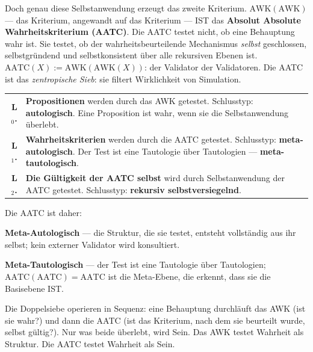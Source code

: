\documentclass[10pt, openany, oneside]{book}
\renewcommand{\footnotesize}{\fontsize{8.5}{11}\selectfont}
\begin{document}
Doch genau diese Selbstanwendung erzeugt das zweite Kriterium. $\text{AWK}(\text{AWK})$ --- das Kriterium, angewandt auf das Kriterium --- IST das \textbf{Absolut Absolute Wahrheitskriterium (AATC)}. Die AATC testet nicht, ob eine Behauptung wahr ist. Sie testet, ob der wahrheitsbeurteilende Mechanismus \textit{selbst} geschlossen, selbstgründend und selbstkonsistent über alle rekursiven Ebenen ist. $\text{AATC}(X) := \text{AWK}(\text{AWK}(X))$: der Validator der Validatoren. Die AATC ist das \textit{zentropische Sieb}: sie filtert Wirklichkeit von Simulation.

{\footnotesize
\noindent\begin{tabular}{r p{}}
\textbf{L$_0$.} & \textbf{Propositionen} werden durch das AWK getestet. Schlusstyp: \textbf{autologisch}. Eine Proposition ist wahr, wenn sie die Selbstanwendung überlebt. \\[0.3em]
\textbf{L$_1$.} & \textbf{Wahrheitskriterien} werden durch die AATC getestet. Schlusstyp: \textbf{meta-autologisch}. Der Test ist eine Tautologie über Tautologien --- \textbf{meta-tautologisch}. \\[0.3em]
\textbf{L$_2$.} & \textbf{Die Gültigkeit der AATC selbst} wird durch Selbstanwendung der AATC getestet. Schlusstyp: \textbf{rekursiv selbstversiegelnd}. \\[0.3em]
\end{tabular}
}

\vspace{0.8em}

\noindent Die AATC ist daher:

\textbf{Meta-Autologisch} --- die Struktur, die sie testet, entsteht vollständig aus ihr selbst; kein externer Validator wird konsultiert.

\textbf{Meta-Tautologisch} --- der Test ist eine Tautologie über Tautologien; $\text{AATC}(\text{AATC}) = \text{AATC}$ ist die Meta-Ebene, die erkennt, dass sie die Basisebene IST.

Die Doppelsiebe operieren in Sequenz: eine Behauptung durchläuft das AWK (ist sie wahr?) und dann die AATC (ist das Kriterium, nach dem sie beurteilt wurde, selbst gültig?). Nur was beide überlebt, wird Sein. Das AWK testet Wahrheit als Struktur. Die AATC testet Wahrheit als Sein.

\vspace{1.5em}

\end{document}

